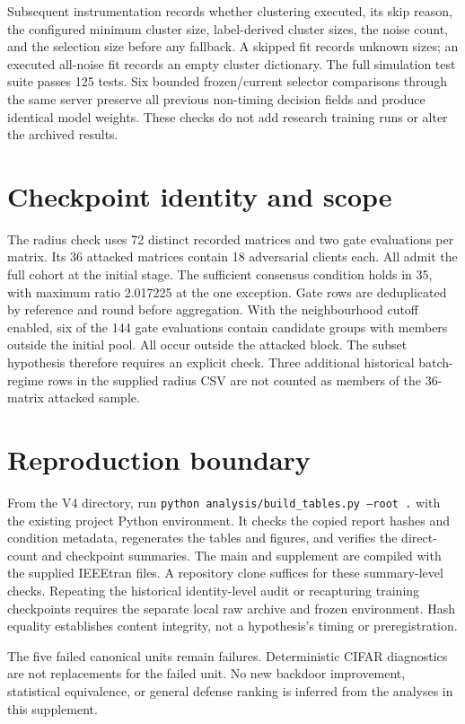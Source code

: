 \documentclass[journal]{IEEEtran}
\begin{document}
Subsequent instrumentation records whether clustering executed, its skip reason, the configured minimum cluster size, label-derived cluster sizes, the noise count, and the selection size before any fallback. A skipped fit records unknown sizes; an executed all-noise fit records an empty cluster dictionary. The full simulation test suite passes 125 tests. Six bounded frozen/current selector comparisons through the same server preserve all previous non-timing decision fields and produce identical model weights. These checks do not add research training runs or alter the archived results.

\section{Checkpoint identity and scope}
The radius check uses 72 distinct recorded matrices and two gate evaluations per matrix. Its 36 attacked matrices contain 18 adversarial clients each. All admit the full cohort at the initial stage. The sufficient consensus condition holds in 35, with maximum ratio 2.017225 at the one exception. Gate rows are deduplicated by reference and round before aggregation. With the neighbourhood cutoff enabled, six of the 144 gate evaluations contain candidate groups with members outside the initial pool. All occur outside the attacked block. The subset hypothesis therefore requires an explicit check. Three additional historical batch-regime rows in the supplied radius CSV are not counted as members of the 36-matrix attacked sample.

\section{Reproduction boundary}
From the V4 directory, run \texttt{python analysis/build\_tables.py --root .} with the existing project Python environment. It checks the copied report hashes and condition metadata, regenerates the tables and figures, and verifies the direct-count and checkpoint summaries. The main and supplement are compiled with the supplied IEEEtran files. A repository clone suffices for these summary-level checks. Repeating the historical identity-level audit or recapturing training checkpoints requires the separate local raw archive and frozen environment. Hash equality establishes content integrity, not a hypothesis's timing or preregistration.

The five failed canonical units remain failures. Deterministic CIFAR diagnostics are not replacements for the failed unit. No new backdoor improvement, statistical equivalence, or general defense ranking is inferred from the analyses in this supplement.
\end{document}
